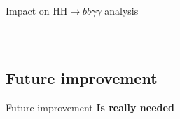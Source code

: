 \begin{frame}{Impact on HH$\to b\bar{b}\gamma\gamma$ analysis}
\begin{columns}
\begin{figure}
\begin{overprint}
    \centering{}
    \end{overprint}
\end{figure}
\end{columns}

\end{frame}

\subsection{Future improvement}
\begin{frame}{Future improvement}
    \textbf{Is really needed}
\end{frame}